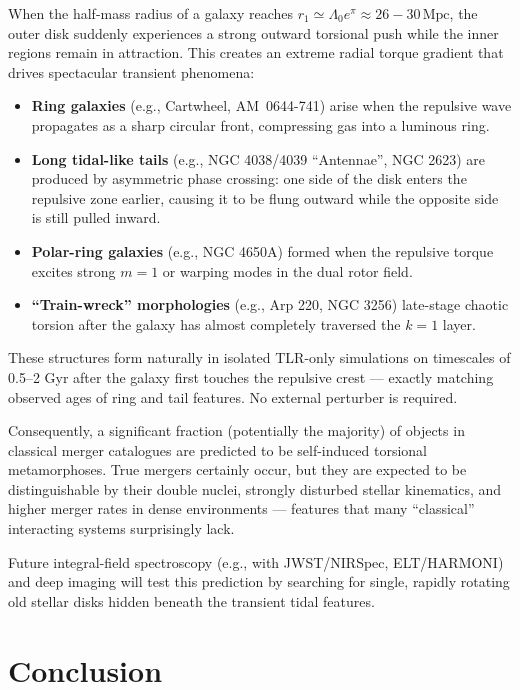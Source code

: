\documentclass[dvipdfmx,11pt,a4paper]{article}
\begin{document}
When the half-mass radius of a galaxy reaches $r_1 \simeq \Lambda_0 e^\pi \approx 26-30\,\mathrm{Mpc}$, the outer disk suddenly experiences a strong outward torsional push while the inner regions remain in attraction.  
This creates an extreme radial torque gradient that drives spectacular transient phenomena:

\begin{itemize}
\item \textbf{Ring galaxies} (e.g., Cartwheel, AM~0644-741) arise when the repulsive wave propagates as a sharp circular front, compressing gas into a luminous ring.
\item \textbf{Long tidal-like tails} (e.g., NGC 4038/4039 ``Antennae'', NGC 2623) are produced by asymmetric phase crossing: one side of the disk enters the repulsive zone earlier, causing it to be flung outward while the opposite side is still pulled inward.
\item \textbf{Polar-ring galaxies} (e.g., NGC 4650A) formed when the repulsive torque excites strong $m=1$ or warping modes in the dual rotor field.
\item \textbf{``Train-wreck'' morphologies} (e.g., Arp 220, NGC 3256) late-stage chaotic torsion after the galaxy has almost completely traversed the $k=1$ layer.
\end{itemize}

These structures form naturally in isolated TLR-only simulations on timescales of 0.5--2 Gyr after the galaxy first touches the repulsive crest --- exactly matching observed ages of ring and tail features.  
No external perturber is required.

Consequently, a significant fraction (potentially the majority) of objects in classical merger catalogues are predicted to be self-induced torsional metamorphoses.  
True mergers certainly occur, but they are expected to be distinguishable by their double nuclei, strongly disturbed stellar kinematics, and higher merger rates in dense environments --- features that many ``classical'' interacting systems surprisingly lack.

Future integral-field spectroscopy (e.g., with JWST/NIRSpec, ELT/HARMONI) and deep imaging will test this prediction by searching for single, rapidly rotating old stellar disks hidden beneath the transient tidal features.

\section{Conclusion}
\end{document}
